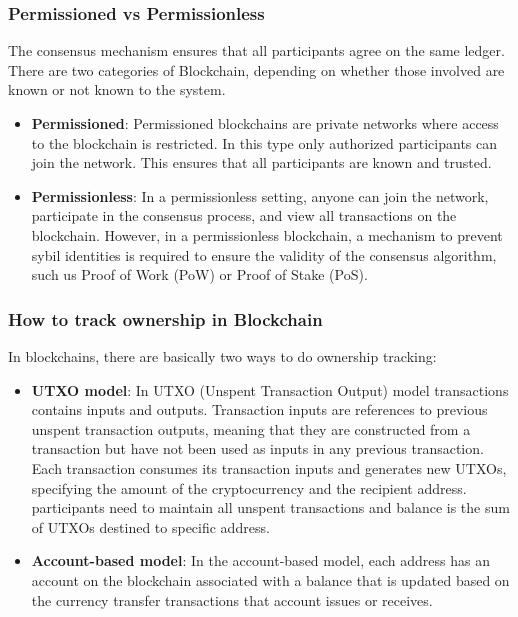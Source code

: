 \subsubsection{Permissioned vs Permissionless}
The consensus mechanism ensures that all participants agree on the same ledger. There are two categories of Blockchain, depending on whether those involved are known or not known to the system. 
\begin{itemize}
    \item \textbf{Permissioned}: Permissioned blockchains are private networks where access to the blockchain is restricted. In this type only authorized participants can join the network. This ensures that all participants are known and trusted.
    \item \textbf{Permissionless}: In a permissionless setting, anyone can join the network, participate in the consensus process, and view all transactions on the blockchain. However, in a permissionless blockchain, a mechanism to prevent sybil identities is required to ensure the validity of the consensus algorithm, such us Proof of Work (PoW) or Proof of Stake (PoS).
\end{itemize}

\subsubsection{How to track ownership in Blockchain}
In blockchains, there are basically two ways to do ownership tracking:
\begin{itemize}
    \item \textbf{UTXO model}: In UTXO (Unspent Transaction Output) model transactions contains inputs and outputs. Transaction inputs are references to previous unspent transaction outputs, meaning that they are constructed from a transaction but have not been used as inputs in any previous transaction. Each transaction consumes its transaction inputs and generates new UTXOs, specifying the amount of the cryptocurrency and the recipient address. participants need to maintain all unspent transactions and balance  is the sum of UTXOs destined to specific address.
    
    \item \textbf{Account-based model}: In the account-based model, each address has an account on the blockchain associated with a balance that is updated based on the currency transfer transactions that account issues or receives.

\end{itemize}